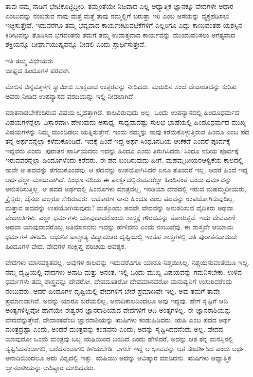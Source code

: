 ತಾವು ನಮ್ಮ ನಾಡಿಗೆ ಭೇಟಿಕೊಟ್ಟಿದ್ದೀರಿ. ತಮ್ಮಂತೆಯೇ ನಿಜವಾದ ಎಲ್ಲ ಆಧ್ಯಾತ್ಮಿಕ ಜ್ಞಾನಕ್ಕೂ ವೇದಗಳೇ ಆಧಾರ ಎಂಬುದನ್ನು ನಂಬಿರುವ ನಾವು ಮತ್ತೆ ಮತ್ತೆ ತಾವು ನಮ್ಮಲ್ಲಿಗೆ ಬರುತ್ತಾ ಇರಿ ಎಂಬ ಆಸೆಯನ್ನು ವ್ಯಕ್ತಪಡಿಸಲು ಇಚ್ಛಿಸುತ್ತೇವೆ. ಇದುವರೆಗೂ ತಮ್ಮ ಭವ್ಯವಾದ ಕಾರ್ಯಚಟುವಟಿಕೆಗಳಿಗೆ ಎಲ್ಲರಿಗೂ ಎದ್ದು ಕಾಣುವಂತಹ ಯಶಸ್ಸಿನ ಕಿರೀಟವನ್ನು ತೊಡಿಸಿದ ಭಗವಂತನು ತಮಗೆ ತಮ್ಮ ಉದಾತ್ತವಾದ ಕಾರ್ಯವನ್ನು ಮುಂದುವರಿಸಲು ಅಗತ್ಯವಾದ ಶಕ್ತಿಯನ್ನೂ ದೀರ್ಘಾಯುಷ್ಯವನ್ನೂ ನೀಡಲಿ ಎಂದು ಪ್ರಾರ್ಥಿಸುತ್ತೇವೆ.

\begin{flushright}
ಇತಿ ತಮ್ಮ ವಿಧೇಯರು\\ಜಾಫ್ನದ ಹಿಂದೂಗಳ ಪರವಾಗಿ.
\end{flushright}

ಮೇಲಿನ ಬಿನ್ನವತ್ತಳೆಗೆ ಸ್ವಾಮೀಜಿ ಸೂಕ್ತವಾದ ಉತ್ತರವನ್ನು ನೀಡಿದರು. ಮರುದಿನ ಸಂಜೆ ವೇದಾಂತವನ್ನು ಕುರಿತು ಅವರು ನೀಡಿದ ಉಪನ್ಯಾಸದ ವರದಿಯನ್ನು ಇಲ್ಲಿ ನೀಡಲಾಗಿದೆ.

ಮಾತನಾಡಬೇಕೆಂದಿರುವ ವಿಷಯ ಬೃಹತ್ತಾಗಿದೆ. ಕಾಲವಿರುವುದು ಅಲ್ಪ. ಒಂದು ಉಪನ್ಯಾಸದಲ್ಲಿ ಹಿಂದೂಧರ್ಮದ ವಿಷಯಗಳನ್ನೆಲ್ಲಾ ವಿಸ್ತಾರವಾಗಿ ಹೇಳುವುದು ಅಸಾಧ್ಯ. ಸಾಧ್ಯವಾದಷ್ಟು ಸುಲಭ ಭಾಷೆಯಲ್ಲಿ ಹಿಂದೂಧರ್ಮದ ಮುಖ್ಯ ವಿಷಯಗಳನ್ನು ನಿಮ್ಮ ಮುಂದಿಡಲು ಯತ್ನಿಸುತ್ತೇನೆ. ಇಂದು ನಮ್ಮನ್ನು ನಾವು ಕರೆದುಕೊಳ್ಳುತ್ತಿರುವ ಹಿಂದೂ ಎಂಬ ಪದ ತನ್ನ ಅರ್ಥವನ್ನೆಲ್ಲಾ ಕಳೆದುಕೊಂಡಿದೆ. ಇದಕ್ಕೆ ಹಿಂದೆ ಇದ್ದ ಅರ್ಥ ಸಿಂಧೂನದಿಯ ಆಚೆಕಡೆ ಎಂದರೆ ಪೂರ್ವಕ್ಕೆ ಇದ್ದವರು ಎಂದು. ಪುರಾತನ ಪಾರ್ಸಿಯವರು ಇದನ್ನು ಹಿಂದೂ ಎಂದು ತಿರುಗಿಸಿದರು. ಸಿಂಧೂ ನದಿಯ ಪೂರ್ವಕ್ಕೆ ಇರುವವರನ್ನೆಲ್ಲಾ ಹಿಂದೂಗಳೆಂದು ಕರೆದರು. ಈ ಪದ ಬಂದಿರುವುದು ಹೀಗೆ. ಮಹಮ್ಮದೀಯರ\break ಆಳ್ವಿಕೆಯ ಕಾಲದಲ್ಲಿ ನಾವೇ ಆ ಪದವನ್ನು ತೆಗೆದುಕೊಂಡೆವು. ಆ ಪದವನ್ನು ಉಪಯೋಗಿಸಿದರೆ ಏನೂ ತೊಂದರೆ ಇಲ್ಲ. ಆದರೆ ಹಿಂದೆ ಇದ್ದ ಅರ್ಥವೆಲ್ಲಾ ಮಾಯವಾಗಿದೆ. ಸಿಂಧೂ ನದಿಯ ಈ ಪಾರ್ಶ್ವದಲ್ಲಿರುವವರೆಲ್ಲಾ ಹಿಂದಿನಂತೆ ಒಂದು ಧರ್ಮವನ್ನು ಅನುಸರಿಸುತ್ತಿಲ್ಲ. ಆ ಪದದ ಅರ್ಥದಲ್ಲಿ ಹಿಂದೂಗಳು ಮಾತ್ರವಲ್ಲ, ಇಂಡಿಯಾ ದೇಶದಲ್ಲಿ ಇರುವ ಮಹಮ್ಮದೀಯರು, ಕ್ರೈಸ್ತರು, ಜೈನರು ಎಲ್ಲರೂ ಸೇರಿರುವರು. ಆದಕಾರಣ ನಾನು ಹಿಂದೂ ಎಂಬ ಪದವನ್ನು ಉಪಯೋಗಿಸುವುದಿಲ್ಲ. ಮತ್ತಾವ ಪದವನ್ನು ಉಪಯೋಗಿಸುವುದು? ಮತ್ತೊಂದು ಪದವೇ ವೇದವನ್ನು ಅನುಸರಿಸುವ ವೈದಿಕರು ಅಥವಾ ವೇದಾಂತಿಗಳು. ಎಲ್ಲಾ ಧರ್ಮಗಳು ಯಾವುದಾದರೊಂದು ಶಾಸ್ತ್ರಕ್ಕೆ ಗೌರವವನ್ನು ತೋರುತ್ತವೆ. ಇದು ದೇವವಾಣಿ ಅಥವಾ ಯಾವುದಾದರೊಬ್ಬ ಅತಿಮಾನವನು ಇದನ್ನು ಹೇಳಿದನು ಎಂದು ನಂಬುವೆವು. ಈ ಶಾಸ್ತ್ರವೇ ಆಯಾಯ ಧರ್ಮಗಳ ತಳಹದಿ. ಆಧುನಿಕ ಪಾಶ್ಚಾತ್ಯ ವಿದ್ಯಾವಂತರ ದೃಷ್ಟಿಯಲ್ಲಿ ಇಂತಹ ಶಾಸ್ತ್ರಗಳಲ್ಲಿ ಅತಿ ಪುರಾತನವಾದುದೇ ಹಿಂದೂಗಳ ವೇದ. ವೇದಗಳ ಸಂಕ್ಷಿಪ್ತ ಪರಿಚಯ ಆವಶ್ಯಕ.

ವೇದಗಳು ಮಾನವಕೃತವಲ್ಲ. ಅವುಗಳ ಕಾಲವನ್ನು ಇದುವರೆವಿಗೂ ಯಾರೂ ನಿಶ್ಚಯಿ\-ಸಿಲ್ಲ, ನಿಶ್ಚಯಿಸುವಂತೆಯೂ ಇಲ್ಲ. ನಮ್ಮ ದೃಷ್ಟಿಯಲ್ಲಿ ವೇದಗಳು ಅನಾದಿ ಮತ್ತು ಅನಂತ. ಇಲ್ಲಿ ಒಂದು ಮುಖ್ಯ ವಿಷಯವನ್ನು ಗಮನಿಸಬೇಕು. ಉಳಿದ ಧರ್ಮಗಳು ತಮ್ಮ ಶಾಸ್ತ್ರವನ್ನು ದೇವರೋ, ದೇವದೂತರೋ ದೇವಮಾನವರೋ ಮನುಷ್ಯನಿಗೆ ಉಸುರಿದರೆಂದು ನಂಬುವರು. ಆದರೆ ಹಿಂದೂಗಳ ದೃಷ್ಟಿಯಲ್ಲಿ ವೇದಗಳಿಗೆ ಬೇರೆ ಪ್ರಮಾಣವೇ ಇಲ್ಲ. ಅವು ತಮಗೆ ತಾವೇ ಪ್ರಮಾಣವಾಗಿವೆ. ಅವನ್ನು ಯಾರೂ ಬರೆಯಲಿಲ್ಲ, ಅನಾದಿಕಾಲದಿಂದಲೂ ಅವು ಇದ್ದವು. ಹೇಗೆ ಸೃಷ್ಟಿಗೆ ಆದಿ ಅಂತ್ಯಗಳಿಲ್ಲವೋ ಹಾಗೆಯೇ ಈಶ್ವರನ ಜ್ಞಾನರಾಶಿಯಾದ ವೇದಗಳಿಗೆ ಆದಿ ಅಂತ್ಯಗಳಿಲ್ಲ. ಈ ಜ್ಞಾನರಾಶಿಯನ್ನು ವೇದವೆನ್ನುತ್ತೇವೆ. ವೇದಾಂತವೆಂಬ ಜ್ಞಾನರಾಶಿಯನ್ನು ಋಷಿಗಳು ಕಂಡುಹಿಡಿದರು. ಋಷಿ ಎಂಬ ಪದದ ಅರ್ಥ ಮಂತ್ರದ್ರಷ್ಟಾ ಎಂದು, ಅಂದರೆ ಮಂತ್ರವನ್ನು ಕಂಡವನು ಎಂದು; ಅದನ್ನು ಸೃಷ್ಟಿಸಿದವನೆಂದು ಅಲ್ಲ. ವೇದದ ಯಾವುದೋ ಒಂದು ಮಂತ್ರವು ಒಬ್ಬ ಋಷಿಯಿಂದ ಬಂದಿದೆ ಎಂದು ಹೇಳಿದರೆ, ಅದನ್ನು ಆತ ತನ್ನ ಮನಸ್ಸಿನಲ್ಲಿ ಸೃಷ್ಟಿಸಿದನೆಂದಾಗಲಿ, ಬರೆದನೆಂದಾಗಲಿ ತಿಳಿಯಬೇಡಿ. ಆಗಲೇ ಇದ್ದ ಆ ಭಾವವನ್ನು ಆತ ಸಂದರ್ಶಿಸಿದ ಎಂದು ಅರ್ಥ. ಅನಾದಿಯಿಂದಲೂ ಅದು ವಿಶ್ವದಲ್ಲಿ ಇತ್ತು. ಋಷಿಯು ಅದನ್ನು ಆವಿಷ್ಕಾರ ಮಾಡಿದನು. ಋಷಿಗಳು ಆಧ್ಯಾತ್ಮಿಕ ಜ್ಞಾನರಾಶಿಯನ್ನು ಆವಿಷ್ಕಾರ ಮಾಡಿದವರು.


